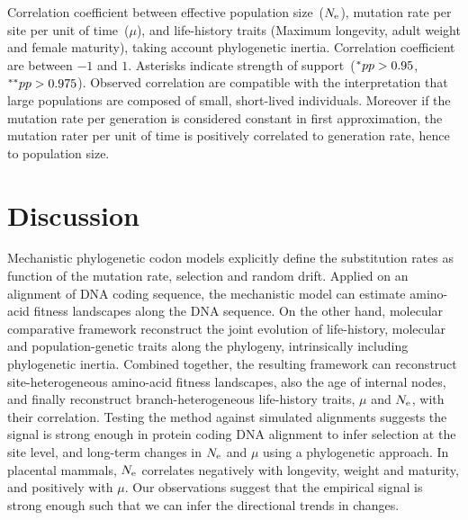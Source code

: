 \begin{table}[H]
	
	\caption[Traits correlation]{
		Correlation coefficient between effective population size~($N_{\mathrm{e}}$), mutation rate per site per unit of time~($\mu$), and life-history traits (Maximum longevity, adult weight and female maturity), taking account phylogenetic inertia.
		Correlation coefficient are between $-1$ and $1$.
		Asterisks indicate strength of support~($\smash{^{*}} pp > 0.95$, $\smash{^{**}} pp > 0.975$).
		Observed correlation are compatible with the interpretation that large populations are composed of small, short-lived individuals.
		Moreover if the mutation rate per generation is considered constant in first approximation, the mutation rater per unit of time is positively correlated to generation rate, hence to population size.
	}
	\label{fig:mammals_correlation}
\end{table}

\section{Discussion}
\label{sec:Discussion}
Mechanistic phylogenetic \gls{codon} models explicitly define the \gls{substitution} rates as function of the mutation rate, selection and random drift.
Applied on an alignment of \acrshort{DNA} coding sequence, the mechanistic model can estimate amino-acid fitness landscapes along the \acrshort{DNA} sequence.
On the other hand, molecular comparative framework reconstruct the joint evolution of life-history, molecular and population-genetic traits along the phylogeny, intrinsically including phylogenetic inertia.
Combined together, the resulting framework can reconstruct site-heterogeneous amino-acid fitness landscapes, also the age of internal nodes, and finally reconstruct branch-heterogeneous life-history traits, $\mu$ and $N_{\mathrm{e}}$, with their correlation.
Testing the method against simulated alignments suggests the signal is strong enough in protein coding \acrshort{DNA} alignment to infer selection at the site level, and long-term changes in $N_{\mathrm{e}}$ and $\mu$ using a phylogenetic approach.
In placental mammals, $N_{\mathrm{e}}$ correlates negatively with longevity, weight and maturity, and positively with $\mu$.
Our observations suggest that the empirical signal is strong enough such that we can infer the directional trends in changes.

